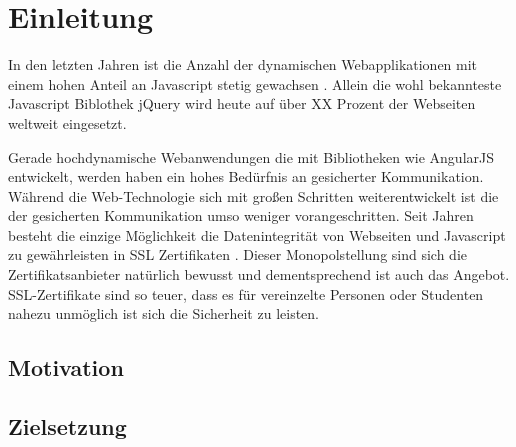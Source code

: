 
\section{Einleitung}





In den letzten Jahren ist die Anzahl der dynamischen Webapplikationen mit einem hohen Anteil an Javascript stetig gewachsen \quelle.
Allein die wohl bekannteste Javascript Biblothek jQuery \urlref wird heute auf über XX Prozent der Webseiten weltweit eingesetzt. \quelle

Gerade hochdynamische Webanwendungen die mit Bibliotheken wie AngularJS \urlref entwickelt, werden haben ein hohes Bedürfnis an gesicherter Kommunikation.
Während die Web-Technologie sich mit großen Schritten weiterentwickelt ist die der gesicherten Kommunikation umso weniger vorangeschritten.
Seit Jahren besteht die einzige Möglichkeit die Datenintegrität von Webseiten und Javascript zu gewährleisten in SSL Zertifikaten .
Dieser Monopolstellung sind sich die Zertifikatsanbieter natürlich bewusst und dementsprechend ist auch das Angebot.
SSL-Zertifikate sind so teuer, dass es für vereinzelte Personen oder Studenten nahezu unmöglich ist sich die Sicherheit zu leisten.


\subsection{Motivation}
\tbd


\subsection{Zielsetzung}

